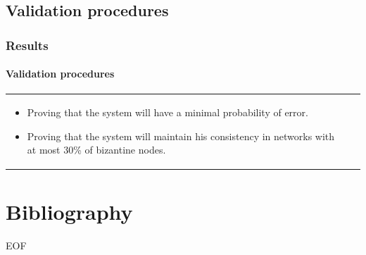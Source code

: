 \documentclass[12pt]{beamer}
\begin{document}
  \subsection{Validation procedures}
    \begin{frame}
    \frametitle{Results}
    \framesubtitle{Validation procedures}
    \begin{table}
    \begin{tabular}{p{7cm}p{3cm}}
      \begin{itemize}
          \item Proving that the system will have a minimal probability of error.
          \item Proving that the system will  maintain his consistency in networks with at most 30\% of bizantine nodes. 
      \end{itemize}
    &
    \vspace{1.5cm}
    \end{tabular}
    \end{table}
    \end{frame}

  \section{Bibliography}
\frame
{
	\vspace{2cm}
	\begin{center}
		\Large{EOF}
	\end{center}
}
\end{document}
